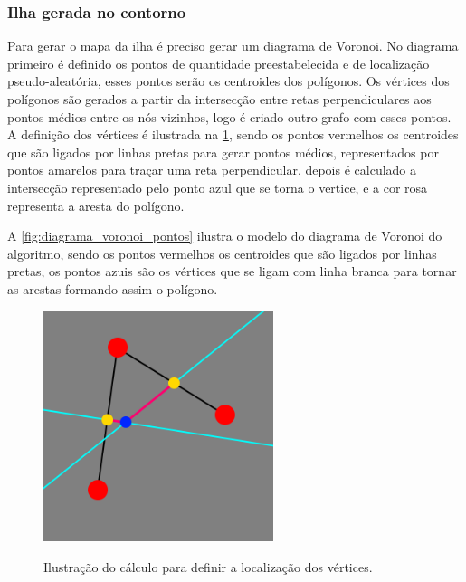 \subsubsection{Ilha gerada no contorno}

Para gerar o mapa da ilha é preciso gerar um diagrama de Voronoi. No diagrama primeiro é definido os pontos de quantidade preestabelecida e de localização pseudo-aleatória, esses pontos serão os centroides dos polígonos. Os vértices dos polígonos são gerados a partir da intersecção entre retas perpendiculares aos pontos médios entre os nós vizinhos, logo é criado outro grafo com esses pontos. A definição dos vértices é ilustrada na \cref{fig:explicacao_vertice}, sendo os pontos vermelhos os centroides que são ligados por linhas pretas para gerar pontos médios, representados por pontos amarelos para traçar uma reta perpendicular, depois é calculado a intersecção representado pelo ponto azul que se torna o vertice, e a cor rosa representa a aresta do polígono.

A \cref{fig:diagrama_voronoi_pontos} ilustra o modelo do diagrama de Voronoi do algoritmo, sendo os pontos vermelhos os centroides que são ligados por linhas pretas, os pontos azuis são os vértices que se ligam com linha branca para tornar as arestas formando assim o polígono.


\begin{figure}[!ht]
	\centering
    \caption{Ilustração do cálculo para definir a localização dos vértices.}
	\includegraphics[width=0.6\textwidth]{figures/explicacao_vertice.png}
	\label{fig:explicacao_vertice}
\end{figure}

